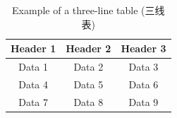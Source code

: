 \documentclass{article}
\begin{document}
\begin{table}[h]
\centering
\begin{tabular}{ccc}
\toprule
Header 1 & Header 2 & Header 3 \\
\midrule
Data 1   & Data 2   & Data 3   \\
Data 4   & Data 5   & Data 6   \\
Data 7   & Data 8   & Data 9   \\
\bottomrule
\end{tabular}
\caption{Example of a three-line table (三线表)}
\label{tab:example}
\end{table}
\end{document}
